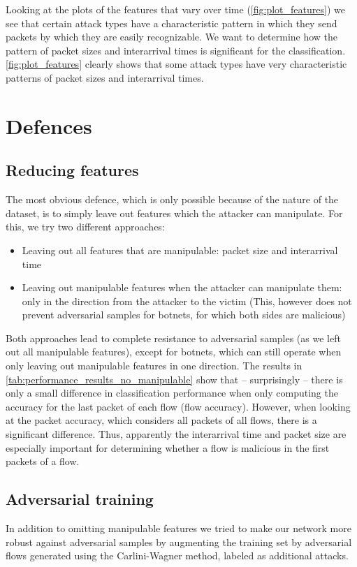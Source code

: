 \documentclass[conference]{IEEEtran}
\begin{document}
Looking at the plots of the features that vary over time (\autoref{fig:plot_features}) we see that certain attack types have a characteristic pattern in which they send packets by which they are easily recognizable. We want to determine how the pattern of packet sizes and interarrival times is significant for the classification. \autoref{fig:plot_features} clearly shows that some attack types have very characteristic patterns of packet sizes and interarrival times.

\section{Defences}

\subsection{Reducing features}
The most obvious defence, which is only possible because of the nature of the dataset, is to simply leave out features which the attacker can manipulate. For this, we try two different approaches:
\begin{itemize}
\item Leaving out all features that are manipulable: packet size and interarrival time
\item Leaving out manipulable features when the attacker can manipulate them: only in the direction from the attacker to the victim (This, however does not prevent adversarial samples for botnets, for which both sides are malicious)
\end{itemize}

Both approaches lead to complete resistance to adversarial samples (as we left out all manipulable features), except for botnets, which can still operate when only leaving out manipulable features in one direction. The results in \autoref{tab:performance_results_no_manipulable} show that -- surprisingly -- there is only a small difference in classification performance when only computing the accuracy for the last packet of each flow (flow accuracy). However, when looking at the packet accuracy, which considers all packets of all flows, there is a significant difference. Thus, apparently the interarrival time and packet size are especially important for determining whether a flow is malicious in the first packets of a flow.

\subsection{Adversarial training}
In addition to omitting manipulable features we tried to make our network more robust against adversarial samples by augmenting the training set by adversarial flows generated using the Carlini-Wagner method, labeled as additional attacks.
\end{document}
